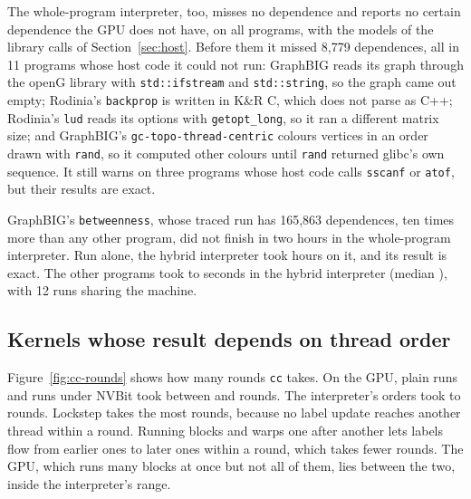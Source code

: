 \documentclass[11pt]{article}
\newcommand{\secref}[1]{Section~\ref{#1}}
\newcommand{\figref}[1]{Figure~\ref{#1}}
\newcommand{\code}[1]{\texttt{#1}}
\begin{document}
The whole-program interpreter, too, misses no dependence and reports no certain dependence the GPU does not have,
on all \numBenchFuDone{} programs, with the models of the library calls of \secref{sec:host}. Before them it missed
8{,}779 dependences, all in 11 programs whose host code it could not run: GraphBIG reads its graph through the openG
library with \code{std::ifstream} and \code{std::string}, so the graph came out empty; Rodinia's \code{backprop} is
written in K\&R C, which does not parse as C++; Rodinia's \code{lud} reads its options with \code{getopt\_long}, so it
ran a different matrix size; and GraphBIG's \code{gc-topo-thread-centric} colours vertices in an order drawn with
\code{rand}, so it computed other colours until \code{rand} returned glibc's own sequence. It still warns on three
programs whose host code calls \code{sscanf} or \code{atof}, but their results are exact.

GraphBIG's \code{betweenness}, whose traced run has 165{,}863 dependences, ten times more than any other program,
did not finish in two hours in the whole-program interpreter. Run alone, the hybrid interpreter took
\numBenchHyAloneHours{} hours on it, and its result is exact. The other programs took \numBenchHyTimeLo{} to
\numBenchHyTimeHi{} seconds in the hybrid interpreter (median \numBenchHyTimeMedian{}), with 12 runs sharing the
machine.

\begin{table}[tbp]
\centering
\scriptsize
\setlength{\tabcolsep}{3.5pt}

\caption{Every benchmark. Ops is the number of operations in the traced run, GPU deps its dependences. Per
interpreter: certain dependences (all of which the traced run has), possible dependences the run has (Poss.\ yes) and
does not have (Poss.\ no), the run's dependences not reported (FN), and the interpreter's run time in seconds under
four thread orders (the hybrid interpreter's with block references recorded and the three orders after lockstep
run at the same time).}
\label{tab:benchmarks}
\end{table}

\subsection{Kernels whose result depends on thread order}
\label{sec:eval-cc}

\figref{fig:cc-rounds} shows how many rounds \code{cc} takes. On the GPU, \numCcPlain{} plain runs and
\numCcReps{} runs under NVBit took between \numCcGpuRoundsLo{} and \numCcGpuRoundsHi{} rounds. The interpreter's
orders took \numCcInterpRoundsLo{} to \numCcInterpRoundsHi{} rounds. Lockstep takes the most rounds, because no
label update reaches another thread within a round. Running blocks and warps one after another lets labels flow
from earlier ones to later ones within a round, which takes fewer rounds. The GPU, which runs many blocks at once
but not all of them, lies between the two, inside the interpreter's range.
\end{document}

